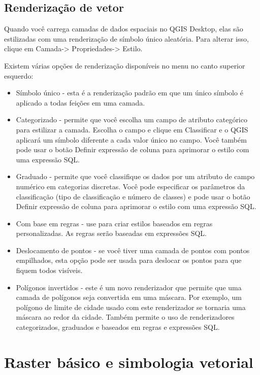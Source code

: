 \documentclass[
  portuguese,
]{krantz}
\providecommand{\tightlist}{%
  \setlength{\itemsep}{0pt}\setlength{\parskip}{0pt}}
\begin{document}
\hypertarget{renderizauxe7uxe3o-de-vetor}{%
\subsection{\texorpdfstring{\textbf{Renderização de vetor}}{Renderização de vetor}}\label{renderizauxe7uxe3o-de-vetor}}

Quando você carrega camadas de dados espaciais no QGIS Desktop, elas são estilizadas com uma renderização de símbolo único aleatória. Para alterar isso, clique em Camada-\textgreater{} Propriedades-\textgreater{} Estilo.

Existem várias opções de renderização disponíveis no menu no canto superior esquerdo:

\begin{itemize}
\tightlist
\item
  Símbolo único - esta é a renderização padrão em que um único símbolo é aplicado a todas feições em uma camada.
\item
  Categorizado - permite que você escolha um campo de atributo categórico para estilizar a camada. Escolha o campo e clique em Classificar e o QGIS aplicará um símbolo diferente a cada valor único no campo. Você também pode usar o botão Definir expressão de coluna para aprimorar o estilo com uma expressão SQL.
\item
  Graduado - permite que você classifique os dados por um atributo de campo numérico em categorias discretas. Você pode especificar os parâmetros da classificação (tipo de classificação e número de classes) e pode usar o botão Definir expressão de coluna para aprimorar o estilo com uma expressão SQL.
\item
  Com base em regras - use para criar estilos baseados em regras personalizadas. As regras serão baseadas em expressões SQL.
\item
  Deslocamento de pontos - se você tiver uma camada de pontos com pontos empilhados, esta opção pode ser usada para deslocar os pontos para que fiquem todos visíveis.
\item
  Polígonos invertidos - este é um novo renderizador que permite que uma camada de polígonos seja convertida em uma máscara. Por exemplo, um polígono de limite de cidade usado com este renderizador se tornaria uma máscara ao redor da cidade. Também permite o uso de renderizadores categorizados, graduados e baseados em regras e expressões SQL.
\end{itemize}

\hypertarget{raster-buxe1sico-e-simbologia-vetorial}{%
\section{Raster básico e simbologia vetorial}\label{raster-buxe1sico-e-simbologia-vetorial}}
\end{document}
